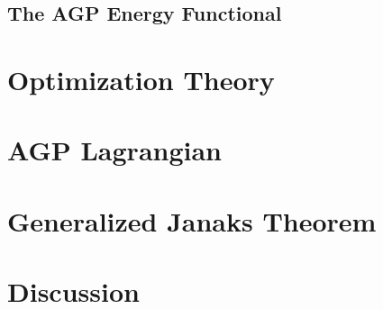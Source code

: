 \documentclass[aps,preprint]{revtex4}%
\begin{document}
\subsection{The AGP Energy Functional}

\section{Optimization Theory\label{Optimiz}}

\bigskip

\section{\bigskip AGP Lagrangian\label{Lagran}}

\section{\bigskip Generalized Janaks Theorem\label{General}}

\section{\bigskip Discussion\label{Discuss}}
\end{document}
